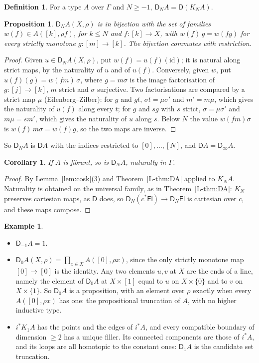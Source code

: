 \documentclass[11pt]{article}
\newcommand{\El}{\mathsf{El}}
\newcommand{\id}{\mathrm{id}}
\newcommand{\D}{\mathsf{D}}
\theoremstyle{plain}
\newtheorem{proposition}[theorem]{Proposition}
\newtheorem{corollary}[theorem]{Corollary}
\theoremstyle{definition}
\newtheorem{definition}[theorem]{Definition}
\newtheorem{example}[theorem]{Example}
\theoremstyle{remark}
\begin{document}
\begin{definition}
For a type $A$ over $\Gamma$ and $N\ge-1$, $\D_NA=\D(K_N A)$.
\end{definition}

\begin{proposition}\label{prop:DN}
$\D_NA(X,\rho)$ is in bijection with the set of families $w(f)\in
A([k],\rho f)$, for $k\le N$ and $f:[k]\to X$, with $w(f)\,g=w(fg)$ for
every strictly monotone $g:[m]\to[k]$. The bijection commutes with
restriction.
\end{proposition}

\begin{proof}
Given $u\in\D_NA(X,\rho)$, put $w(f)=u(f)(\id)$; it is natural along strict
maps, by the naturality of $u$ and of $u(f)$. Conversely, given $w$, put
$u(f)(g)=w(fm)\,\sigma$, where $g=m\sigma$ is the image factorisation of
$g:[j]\to[k]$, $m$ strict and $\sigma$ surjective. Two factorisations are
compared by a strict map $\mu$ (Eilenberg--Zilber): for $g$ and $gt$,
$\sigma t=\mu\sigma'$ and $m'=m\mu$, which gives the naturality of $u(f)$
along every $t$; for $g$ and $sg$ with $s$ strict, $\sigma=\mu\sigma'$ and
$m\mu=sm'$, which gives the naturality of $u$ along $s$. Below $N$ the value
$w(fm)\sigma$ is $w(f)\,m\sigma=w(f)g$, so the two maps are inverse.
\end{proof}

So $\D_NA$ is $\D A$ with the indices restricted to $[0],\dots,[N]$, and
$\D A=\D_\infty A$.

\begin{corollary}\label{cor:fib}
If $A$ is fibrant, so is $\D_NA$, naturally in $\Gamma$.
\end{corollary}

\begin{proof}
By Lemma~\ref{lem:cosk}(3) and Theorem~\ref{L-thm:DA} applied to $K_NA$.
Naturality is obtained on the universal family, as in
Theorem~\ref{L-thm:DA}: $K_N$ preserves cartesian maps, as $\D$ does, so
$\D_N(c^*\El)\to\D_N\El$ is cartesian over $c$, and these maps compose.
\end{proof}

\begin{example}\label{ex:low}
\leavevmode
\begin{itemize}
\item $\D_{-1}A=1$.
\item $\D_0A(X,\rho)=\prod_{x\in X}A([0],\rho x)$, since the only strictly
  monotone map $[0]\to[0]$ is the identity. Any two elements $u,v$ at $X$
  are the ends of a line, namely the element of $\D_0A$ at $X\times[1]$
  equal to $u$ on $X\times\{0\}$ and to $v$ on $X\times\{1\}$. So $\D_0A$
  is a proposition, with an element over $\rho$ exactly when every $A([0],\rho x)$
  has one: the propositional truncation of $A$, with no higher inductive
  type.
\item $i^*K_1A$ has the points and the edges of $i^*A$, and every
  compatible boundary of dimension $\ge2$ has a unique filler. Its
  connected components are those of $i^*A$, and its loops are all
  homotopic to the constant ones: $\D_1A$ is the candidate set truncation.
\end{itemize}
\end{example}
\end{document}
